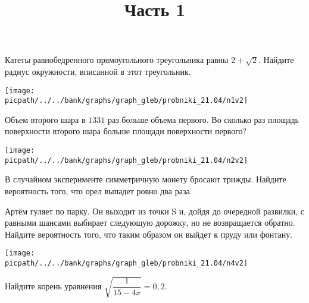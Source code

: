 \begin{training}[2]
	\title{Часть 1}
	\egepreambone
	\begin{listofex}
		\item
		\begin{minipage}[t]{\bodywidth}
			Катеты равнобедренного прямоугольного треугольника равны \( 2+\sqrt{2} \). Найдите радиус окружности, вписанной в этот треугольник.
			\foranswer
		\end{minipage}
		\gapwidth
		\begin{minipage}[t]{\picwidth}
			\texttt{[image: \\picpath/../../bank/graphs/graph\_gleb/probniki\_21.04/n1v2]}
		\end{minipage}
		\item
		\begin{minipage}[t]{\bodywidth}
			Объем второго шара в \( 1331 \) раз больше объема первого. Во сколько раз площадь поверхности второго шара больше площади поверхности первого?
			\foranswer
		\end{minipage}
		\gapwidth
		\begin{minipage}[t]{\picwidth}
			\texttt{[image: \\picpath/../../bank/graphs/graph\_gleb/probniki\_21.04/n2v2]}
		\end{minipage}
		\item В случайном эксперименте симметричную монету бросают трижды. Найдите вероятность того, что орел выпадет ровно два раза.
		\foranswer
		\item 
			Артём гуляет по парку. Он выходит из точки S и, дойдя до очередной развилки, с равными шансами выбирает следующую дорожку, но не возвращается обратно. Найдите вероятность того, что таким образом он выйдет к пруду или фонтану.
			\foranswer
		\begin{center}
			\texttt{[image: \\picpath/../../bank/graphs/graph\_gleb/probniki\_21.04/n4v2]}
		\end{center}
		\item Найдите корень уравнения \( \sqrt{\dfrac{1}{15-4x}}=0,2 \). 
		\foranswer
		

\end{listofex}
\end{training}
